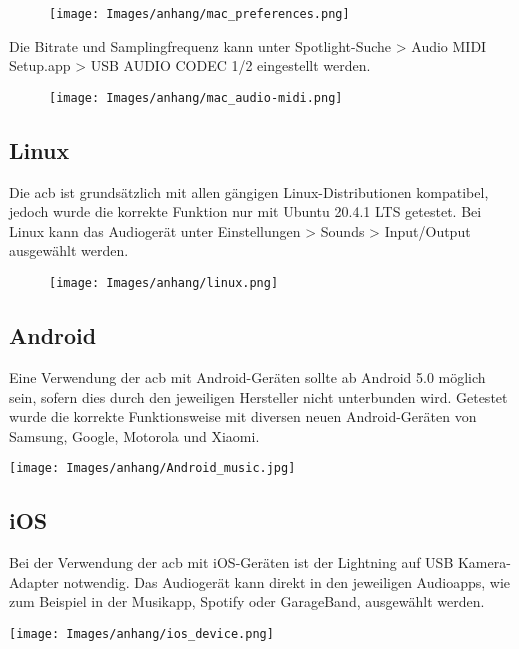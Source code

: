 \begin{figure}[H]
    \centering
    \texttt{[image: Images/anhang/mac\_preferences.png]}
    \caption*{}
\end{figure}
Die Bitrate und Samplingfrequenz kann unter \dq Spotlight-Suche > Audio MIDI Setup.app > USB AUDIO CODEC 1/2\dq\; eingestellt werden.
\begin{figure}[H]
    \centering
    \texttt{[image: Images/anhang/mac\_audio-midi.png]}
    \caption*{}
\end{figure}
\pagebreak
\subsection{Linux}
Die \ac{acb} ist grundsätzlich mit allen gängigen Linux-Distributionen kompatibel, jedoch wurde die korrekte Funktion nur mit Ubuntu 20.4.1 LTS getestet. Bei Linux kann das Audiogerät unter \dq Einstellungen > Sounds > Input/Output\dq\; ausgewählt werden.
\begin{figure}[H]
    \centering
    \texttt{[image: Images/anhang/linux.png]}
    \caption*{}
\end{figure}

\pagebreak
\subsection{Android}
\begin{minipage}[t]{0.55\textwidth}
Eine Verwendung der \ac{acb} mit Android-Geräten sollte ab Android 5.0 möglich sein, sofern dies durch den jeweiligen Hersteller nicht unterbunden wird. Getestet wurde die korrekte Funktionsweise mit diversen neuen Android-Geräten von Samsung, Google, Motorola und Xiaomi. 
\end{minipage}
\begin{minipage}[t]{0.45\textwidth}
    \vspace{-5pt}
    \centering
    \texttt{[image: Images/anhang/Android\_music.jpg]}
\end{minipage}


\subsection{iOS}
\begin{minipage}[t]{0.55\textwidth}
Bei der Verwendung der \ac{acb} mit iOS-Geräten ist der \dq Lightning auf USB Kamera-Adapter\dq\; notwendig.
Das Audiogerät kann direkt in den jeweiligen Audioapps, wie zum Beispiel in der Musikapp, Spotify oder GarageBand, ausgewählt werden. 
\end{minipage}
\begin{minipage}[t]{0.45\textwidth}
    \vspace{0pt}
    \centering
    \texttt{[image: Images/anhang/ios\_device.png]}
\end{minipage}




